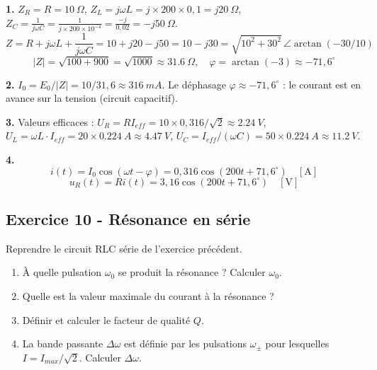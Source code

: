 \documentclass[12pt,a4paper]{article}
\begin{document}
\begin{boitecorrige}
\textbf{1.} $Z_R = R = \qty{10}{\Omega}$, $Z_L = j\omega L = j\times200\times0{,}1 = j\qty{20}{\Omega}$, $Z_C = \frac{1}{j\omega C} = \frac{1}{j\times200\times10^{-4}} = \frac{-j}{0{,}02} = -j\qty{50}{\Omega}$.
\[
Z = R+j\omega L+\frac{1}{j\omega C} = 10+j20-j50 = 10-j30 = \sqrt{10^2+30^2}\,\angle\arctan(-30/10)
\]
\[
|Z| = \sqrt{100+900} = \sqrt{1000} \approx \qty{31.6}{\Omega}, \quad \varphi = \arctan(-3) \approx -71{,}6^\circ 
\]

\textbf{2.} $I_0 = E_0/|Z| = 10/31{,}6 \approx \qty{316}{mA}$. Le déphasage $\varphi\approx-71{,}6^\circ $ : le courant est en avance sur la tension (circuit capacitif).

\textbf{3.} Valeurs efficaces : $U_R = RI_{eff} = 10\times0{,}316/\sqrt{2} \approx \qty{2.24}{V}$, $U_L = \omega L\cdot I_{eff} = 20\times\qty{0.224}{A} \approx \qty{4.47}{V}$, $U_C = I_{eff}/(\omega C) = 50\times\qty{0.224}{A} \approx \qty{11.2}{V}$.

\textbf{4.}
\[
i(t) = I_0\cos(\omega t-\varphi) = 0{,}316\cos(200t+71{,}6^\circ ) \quad [\text{A}]
\]
\[
u_R(t) = Ri(t) = 3{,}16\cos(200t+71{,}6^\circ ) \quad [\text{V}]
\]
\end{boitecorrige}

\subsection*{Exercice 10 - Résonance en série \niveau{\difficile}}

\begin{boiteexercice}
Reprendre le circuit RLC série de l'exercice précédent.
\begin{enumerate}
  \item À quelle pulsation $\omega_0$ se produit la résonance ? Calculer $\omega_0$.
  \item Quelle est la valeur maximale du courant à la résonance ?
  \item Définir et calculer le facteur de qualité $Q$.
  \item La bande passante $\Delta\omega$ est définie par les pulsations $\omega_\pm$ pour lesquelles $I = I_{max}/\sqrt{2}$. Calculer $\Delta\omega$.
\end{enumerate}
\end{boiteexercice}
\end{document}
